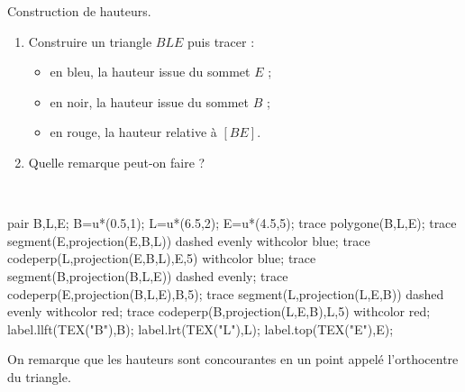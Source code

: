 \begin{exercice*}
   Construction de hauteurs.
   \begin{enumerate}
      \item Construire un triangle $BLE$ puis tracer :
      \begin{itemize}
         \item en bleu, la hauteur issue du sommet $E$ ;
         \item en noir, la hauteur issue du sommet $B$ ;
         \item en rouge, la hauteur relative à $[BE]$.
      \end{itemize}
       \item Quelle remarque peut-on faire ?
   \end{enumerate} 
\end{exercice*}

\begin{corrige}
   \ \\ [-5mm]
   \begin{Geometrie}
      pair B,L,E;
      B=u*(0.5,1);
      L=u*(6.5,2);
      E=u*(4.5,5);
      trace polygone(B,L,E);
      trace segment(E,projection(E,B,L)) dashed evenly withcolor blue;
      trace codeperp(L,projection(E,B,L),E,5) withcolor blue;
      trace segment(B,projection(B,L,E)) dashed evenly;
      trace codeperp(E,projection(B,L,E),B,5);
      trace segment(L,projection(L,E,B)) dashed evenly withcolor red;
      trace codeperp(B,projection(L,E,B),L,5) withcolor red;
      label.llft(TEX("B"),B);
      label.lrt(TEX("L"),L);
      label.top(TEX("E"),E);
   \end{Geometrie}

   On remarque que {\red les hauteurs sont concourantes} en un point appelé l'orthocentre du triangle.
\end{corrige}
